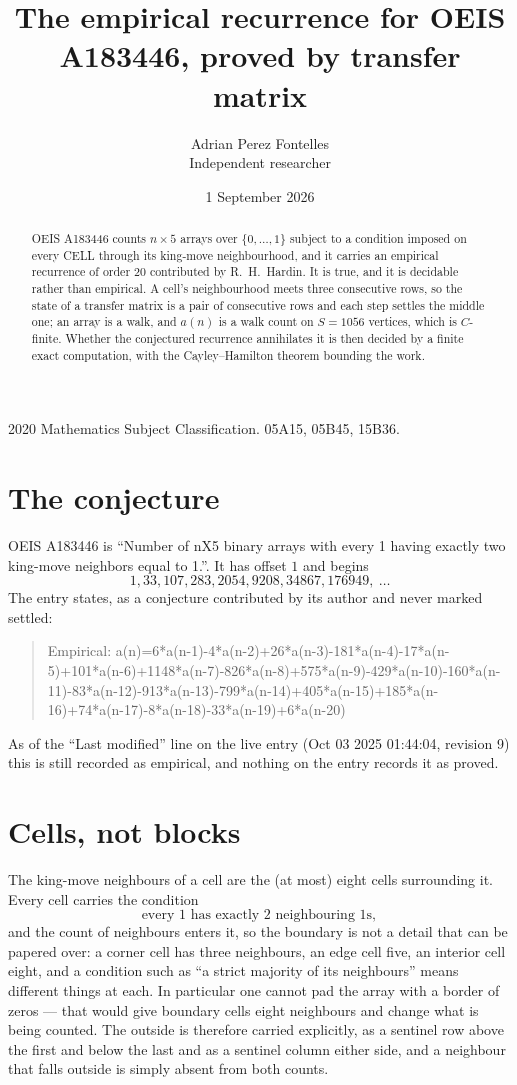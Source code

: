 \documentclass[11pt,a4paper]{article}
\title{The empirical recurrence for OEIS A183446, proved by transfer matrix}
\author{Adrian Perez Fontelles\\ \small Independent researcher}
\date{1 September 2026}
\theoremstyle{plain}
\theoremstyle{definition}
\begin{document}
\maketitle

\begin{abstract}
OEIS A183446 counts $n\times5$ arrays over $\{0,\dots,1\}$ subject to a condition imposed on
every CELL through its king-move neighbourhood, and it carries an empirical recurrence of
order $20$ contributed by R.~H.~Hardin. It is true, and it is decidable rather than
empirical. A cell's neighbourhood meets three consecutive rows, so the state of a transfer
matrix is a pair of consecutive rows and each step settles the middle one; an array is a
walk, and $a(n)$ is a walk count on $S=1056$ vertices, which is $C$-finite. Whether the
conjectured recurrence annihilates it is then decided by a finite exact computation, with the
Cayley--Hamilton theorem bounding the work.
\end{abstract}

\noindent\small 2020 Mathematics Subject Classification. 05A15, 05B45, 15B36.\normalsize

\section{The conjecture}

OEIS A183446 is ``Number of nX5 binary arrays with every 1 having exactly two king-move neighbors equal to 1.''. It has offset $1$ and begins
\[
1, 33, 107, 283, 2054, 9208, 34867, 176949,\ \dots
\]
The entry states, as a conjecture contributed by its author and never marked settled:
\begin{quote}
Empirical: a(n)=6*a(n-1)-4*a(n-2)+26*a(n-3)-181*a(n-4)-17*a(n-5)+101*a(n-6)+1148*a(n-7)-826*a(n-8)+575*a(n-9)-429*a(n-10)-160*a(n-11)-83*a(n-12)-913*a(n-13)-799*a(n-14)+405*a(n-15)+185*a(n-16)+74*a(n-17)-8*a(n-18)-33*a(n-19)+6*a(n-20)
\end{quote}
As of the ``Last modified'' line on the live entry (Oct 03 2025 01:44:04, revision 9) this is still
recorded as empirical, and nothing on the entry records it as proved.

\section{Cells, not blocks}

The king-move neighbours of a cell are the (at most) eight cells surrounding it. Every cell
carries the condition
\[
\text{every }1\text{ has exactly }2\text{ neighbouring }1\text{s},
\]
and the count of neighbours enters it, so the boundary is not a detail that can be papered
over: a corner cell has three neighbours, an edge cell five, an interior cell eight, and a
condition such as ``a strict majority of its neighbours'' means different things at each. In
particular one cannot pad the array with a border of zeros --- that would give boundary cells
eight neighbours and change what is being counted. The outside is therefore carried
explicitly, as a sentinel row above the first and below the last and as a sentinel column
either side, and a neighbour that falls outside is simply absent from both counts.
\end{document}

